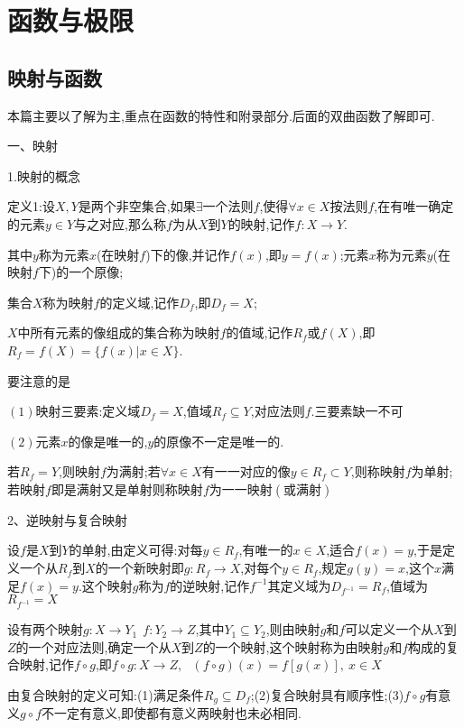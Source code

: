 \documentclass[UTF8]{ctexart}
\begin{document}
\linespread{2}%

\section{\heiti 函数与极限}

\subsection{\heiti 映射与函数}

本篇主要以了解为主,重点在函数的特性和附录部分.后面的双曲函数了解即可.

一、映射

1.映射的概念

定义1:设$X,Y$是两个非空集合,如果$\exists $一个法则$f$,使得$\forall x\in X$按法则$f$,在有唯一确定的元素$y\in Y$与之对应,那么称$f$为从$X$到$Y$的映射,记作$f:X\to Y$.

其中$y$称为元素$x$(在映射$f$)下的像,并记作$f(x)$,即$y=f(x)$;元素$x$称为元素$y$(在映射$f$下)的一个原像;

集合$X$称为映射$f$的定义域,记作$D_f$,即$D_f=X$;

$X$中所有元素的像组成的集合称为映射$f$的值域,记作$R_f$或$f(X)$,即$R_f=f(X)=\{ f(x)| x\in X\}$.

要注意的是

$(1)$映射三要素:定义域$D_f=X$,值域$R_f\displaystyle\subseteq Y$,对应法则$f$.三要素缺一不可

$(2)$元素$x$的像是唯一的,$y$的原像不一定是唯一的.

若$R_f=Y$,则映射$f$为满射;若$\forall x\in X$有一一对应的像$y\in R_f\subset  Y$,则称映射$f$为单射;若映射$f$即是满射又是单射则称映射$f$为一一映射$(\text{或满射})$

2、逆映射与复合映射

设$f$是$X$到$Y$的单射,由定义可得:对每$y\in R_f$,有唯一的$x\in X$,适合$f(x)=y$,于是定义一个从$R_f$到$X$的一个新映射即$g:R_f\to X$,对每个$y\in R_f$,规定$g(y)=x$,这个$x$满足$f(x)=y$.这个映射$g$称为$f$的逆映射,记作$f^{-1}$其定义域为$D_{f^{-1}}=R_f$,值域为$R_{f^{-1}}=X$

设有两个映射$g:X\to Y_1\ \ f:Y_2\to Z$,其中$Y_1\subseteq Y_2$,则由映射$g$和$f$可以定义一个从$X$到$Z$的一个对应法则,确定一个从$X$到$Z$的一个映射,这个映射称为由映射$g$和$f$构成的复合映射,记作$f\circ g$,即$f\circ g :X\to Z, \ \ \ (f\circ g)(x)=f\left[g(x)\right] ,\ x\in X$

由复合映射的定义可知:(1)满足条件$R_g\subseteq D_f$;(2)复合映射具有顺序性;(3)$f\circ g$有意义$g\circ f$不一定有意义,即使都有意义两映射也未必相同.
\end{document}
